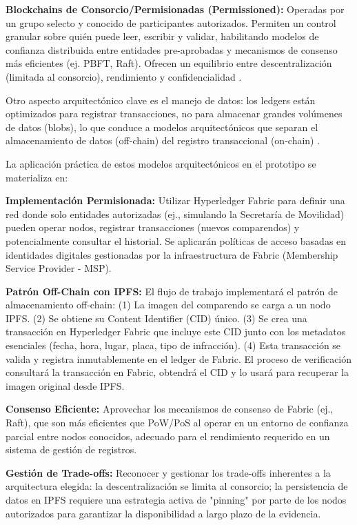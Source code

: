 \documentclass[
    letterpaper, 
    man,   
    spanish,
    12pt,
    donotrepeattitle,
    floatsintext,
    hidelinks %
]{apa7}
\begin{document}
\textbf{Blockchains de Consorcio/Permisionadas (Permissioned):} Operadas por un grupo selecto y conocido de participantes autorizados. Permiten un control granular sobre quién puede leer, escribir y validar, habilitando modelos de confianza distribuida entre entidades pre-aprobadas y mecanismos de consenso más eficientes (ej. PBFT, Raft). Ofrecen un equilibrio entre descentralización (limitada al consorcio), rendimiento y confidencialidad \parencite{vukolic2015quest,cachin2018architecture}.

Otro aspecto arquitectónico clave es el manejo de datos: los ledgers están optimizados para registrar transacciones, no para almacenar grandes volúmenes de datos (blobs), lo que conduce a modelos arquitectónicos que separan el almacenamiento de datos (off-chain) del registro transaccional (on-chain) \parencite{xu2019taxonomy}. 

La aplicación práctica de estos modelos arquitectónicos en el prototipo se materializa en: 

\textbf{Implementación Permisionada: }Utilizar Hyperledger Fabric para definir una red donde solo entidades autorizadas (ej., simulando la Secretaría de Movilidad) pueden operar nodos, registrar transacciones (nuevos comparendos) y potencialmente consultar el historial. Se aplicarán políticas de acceso basadas en identidades digitales gestionadas por la infraestructura de Fabric (Membership Service Provider - MSP). 

\textbf{Patrón Off-Chain con IPFS: } El flujo de trabajo implementará el patrón de almacenamiento off-chain: (1) La imagen del comparendo se carga a un nodo IPFS. (2) Se obtiene su Content Identifier (CID) único. (3) Se crea una transacción en Hyperledger Fabric que incluye este CID junto con los metadatos esenciales (fecha, hora, lugar, placa, tipo de infracción). (4) Esta transacción se valida y registra inmutablemente en el ledger de Fabric. El proceso de verificación consultará la transacción en Fabric, obtendrá el CID y lo usará para recuperar la imagen original desde IPFS. 

\textbf{Consenso Eficiente:} Aprovechar los mecanismos de consenso de Fabric (ej., Raft), que son más eficientes que PoW/PoS al operar en un entorno de confianza parcial entre nodos conocidos, adecuado para el rendimiento requerido en un sistema de gestión de registros. 

\textbf{Gestión de Trade-offs:} Reconocer y gestionar los trade-offs inherentes a la arquitectura elegida: la descentralización se limita al consorcio; la persistencia de datos en IPFS requiere una estrategia activa de "pinning" por parte de los nodos autorizados para garantizar la disponibilidad a largo plazo de la evidencia. 
\end{document}
